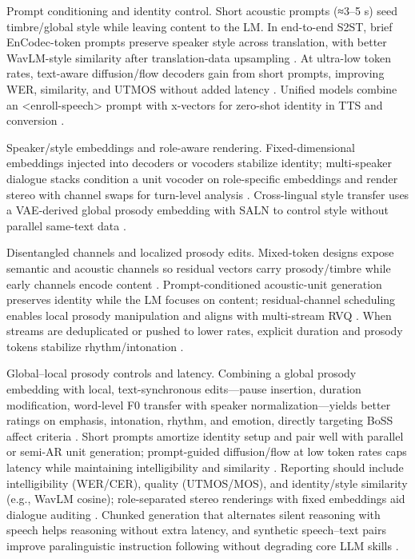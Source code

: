 Prompt conditioning and identity control. Short acoustic prompts (≈3–5 s) seed timbre/global style while leaving content to the LM. In end-to-end S2ST, brief EnCodec-token prompts preserve speaker style across translation, with better WavLM-style similarity after translation-data upsampling \cite{peng2024mslms2stmultitaskspeechlanguagemodeltext}. At ultra-low token rates, text-aware diffusion/flow decoders gain from short prompts, improving WER, similarity, and UTMOS without added latency \cite{wang2025tadicodectextawarediffusionspeechtokeniz}. Unified models combine an <enroll-speech> prompt with x-vectors for zero-shot identity in TTS and conversion \cite{wu2024speechcomposerunifyingmultiplespeechtask}.

Speaker/style embeddings and role-aware rendering. Fixed-dimensional embeddings injected into decoders or vocoders stabilize identity; multi-speaker dialogue stacks condition a unit vocoder on role-specific embeddings and render stereo with channel swaps for turn-level analysis \cite{nakata2024jchatjapaneselargescalespokendialoguecor}. Cross-lingual style transfer uses a VAE-derived global prosody embedding with SALN to control style without parallel same-text data \cite{huang2023holisticcascadesystembenchmarkhumanevalu}.

Disentangled channels and localized prosody edits. Mixed-token designs expose semantic and acoustic channels so residual vectors carry prosody/timbre while early channels encode content \cite{wang2025bossbeyondsemanticspeech}. Prompt-conditioned acoustic-unit generation preserves identity while the LM focuses on content; residual-channel scheduling enables local prosody manipulation and aligns with multi-stream RVQ \cite{peng2024mslms2stmultitaskspeechlanguagemodeltext}. When streams are deduplicated or pushed to lower rates, explicit duration and prosody tokens stabilize rhythm/intonation \cite{huang2023holisticcascadesystembenchmarkhumanevalu}.

Global–local prosody controls and latency. Combining a global prosody embedding with local, text-synchronous edits—pause insertion, duration modification, word-level F0 transfer with speaker normalization—yields better ratings on emphasis, intonation, rhythm, and emotion, directly targeting BoSS affect criteria \cite{huang2023holisticcascadesystembenchmarkhumanevalu,wang2025bossbeyondsemanticspeech}. Short prompts amortize identity setup and pair well with parallel or semi-AR unit generation; prompt-guided diffusion/flow at low token rates caps latency while maintaining intelligibility and similarity \cite{wang2025tadicodectextawarediffusionspeechtokeniz}. Reporting should include intelligibility (WER/CER), quality (UTMOS/MOS), and identity/style similarity (e.g., WavLM cosine); role-separated stereo renderings with fixed embeddings aid dialogue auditing \cite{nakata2024jchatjapaneselargescalespokendialoguecor}. Chunked generation that alternates silent reasoning with speech helps reasoning without extra latency, and synthetic speech–text pairs improve paralinguistic instruction following without degrading core LLM skills \cite{chiang2025stitchsimultaneousthinkingtalkingchunked,lu2025desta2developinginstructionfollowingspee}.

